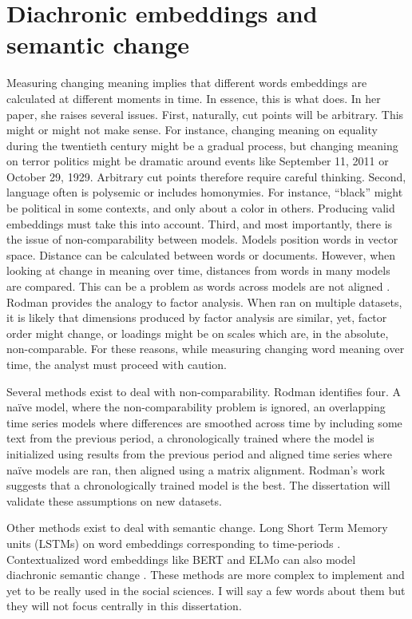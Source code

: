 \documentclass[
  openany]{book}
\begin{document}
\hypertarget{diachronic-embeddings-and-semantic-change}{%
\section{Diachronic embeddings and semantic change}\label{diachronic-embeddings-and-semantic-change}}

Measuring changing meaning implies that different words embeddings are calculated at different moments in time. In essence, this is what \citet{rodman2020timely} does. In her paper, she raises several issues. First, naturally, cut points will be arbitrary. This might or might not make sense. For instance, changing meaning on equality during the twentieth century might be a gradual process, but changing meaning on terror politics might be dramatic around events like September 11, 2011 or October 29, 1929. Arbitrary cut points therefore require careful thinking. Second, language often is polysemic or includes homonymies. For instance, ``black'' might be political in some contexts, and only about a color in others. Producing valid embeddings must take this into account. Third, and most importantly, there is the issue of non-comparability between models. Models position words in vector space. Distance can be calculated between words or documents. However, when looking at change in meaning over time, distances from words in many models are compared. This can be a problem as words across models are not aligned \citep{hamilton2016diachronic}. Rodman provides the analogy to factor analysis. When ran on multiple datasets, it is likely that dimensions produced by factor analysis are similar, yet, factor order might change, or loadings might be on scales which are, in the absolute, non-comparable. For these reasons, while measuring changing word meaning over time, the analyst must proceed with caution.

Several methods exist to deal with non-comparability. Rodman identifies four. A naïve model, where the non-comparability problem is ignored, an overlapping time series models where differences are smoothed across time by including some text from the previous period, a chronologically trained where the model is initialized using results from the previous period and aligned time series where naïve models are ran, then aligned using a matrix alignment. Rodman's work suggests that a chronologically trained model is the best. The dissertation will validate these assumptions on new datasets.

Other methods exist to deal with semantic change. Long Short Term Memory units (LSTMs) on word embeddings corresponding to time-periods \citep{boukhaled2019modelling}. Contextualized word embeddings like BERT and ELMo can also model diachronic semantic change \citep{kutuzov2020distributional}. These methods are more complex to implement and yet to be really used in the social sciences. I will say a few words about them but they will not focus centrally in this dissertation.
\end{document}
